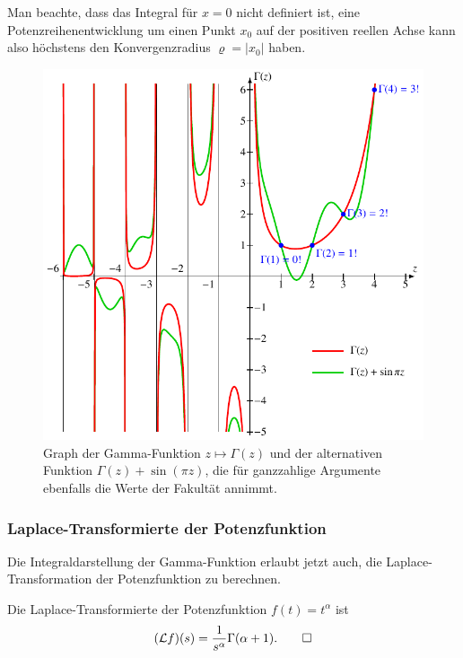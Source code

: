 Man beachte, dass das Integral für $x=0$ nicht definiert ist, eine
Potenzreihenentwicklung um einen Punkt $x_0$ auf der positiven reellen
Achse kann also höchstens den Konvergenzradius $\varrho=|x_0|$ haben.

\begin{figure}
\centering
\includegraphics{chapters/040-rekursion/images/gammaplot.pdf}
\caption{Graph der Gamma-Funktion $z\mapsto\Gamma(z)$ und der alternativen
Funktion $\Gamma(z)+\sin(\pi z)$, die für ganzzahlige Argumente ebenfalls
die Werte der Fakultät annimmt.
\label{buch:rekursion:fig:gamma}}
\end{figure}


\subsubsection{Laplace-Transformierte der Potenzfunktion}
Die Integraldarstellung der Gamma-Funktion erlaubt jetzt auch, die
Laplace-Transformation der Potenzfunktion zu berechnen.

\begin{satz}
Die Laplace-Transformierte der Potenzfunktion $f(t)=t^\alpha$ ist
\[
(\mathcal{L}f)(s)
=
\frac{1}{s^\alpha} \Gamma(\alpha+1).
\qedhere
\]
\end{satz}

